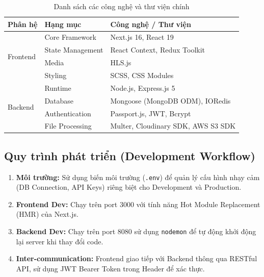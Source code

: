 \begin{table}[H]
\centering
\begin{tabular}{|l|l|l|}
\hline
\textbf{Phân hệ} & \textbf{Hạng mục} & \textbf{Công nghệ / Thư viện} \\ \hline
\multirow{4}{*}{Frontend} & Core Framework & Next.js 16, React 19 \\ \cline{2-3} 
 & State Management & React Context, Redux Toolkit \\ \cline{2-3} 
 & Media & HLS.js \\ \cline{2-3} 
 & Styling & SCSS, CSS Modules \\ \hline
\multirow{4}{*}{Backend} & Runtime & Node.js, Express.js 5 \\ \cline{2-3} 
 & Database & Mongoose (MongoDB ODM), IORedis \\ \cline{2-3} 
 & Authentication & Passport.js, JWT, Bcrypt \\ \cline{2-3} 
 & File Processing & Multer, Cloudinary SDK, AWS S3 SDK \\ \hline
\end{tabular}
\caption{Danh sách các công nghệ và thư viện chính}
\end{table}

\subsection{Quy trình phát triển (Development Workflow)}
\begin{enumerate}
    \item \textbf{Môi trường:} Sử dụng biến môi trường (\texttt{.env}) để quản lý cấu hình nhạy cảm (DB Connection, API Keys) riêng biệt cho Development và Production.
    \item \textbf{Frontend Dev:} Chạy trên port 3000 với tính năng Hot Module Replacement (HMR) của Next.js.
    \item \textbf{Backend Dev:} Chạy trên port 8080 sử dụng \texttt{nodemon} để tự động khởi động lại server khi thay đổi code.
    \item \textbf{Inter-communication:} Frontend giao tiếp với Backend thông qua RESTful API, sử dụng JWT Bearer Token trong Header để xác thực.
\end{enumerate}
